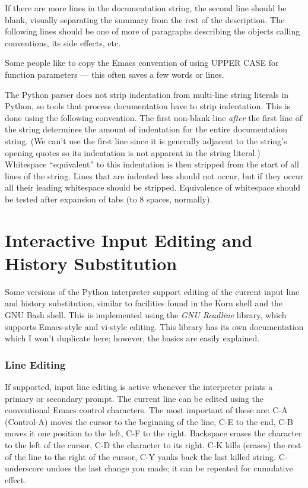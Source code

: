 If there are more lines in the documentation string, the second line
should be blank, visually separating the summary from the rest of the
description.  The following lines should be one of more of paragraphs
describing the objects calling conventions, its side effects, etc.

Some people like to copy the Emacs convention of using UPPER CASE for
function parameters --- this often saves a few words or lines.

The Python parser does not strip indentation from multi-line string
literals in Python, so tools that process documentation have to strip
indentation.  This is done using the following convention.  The first
non-blank line \emph{after} the first line of the string determines the
amount of indentation for the entire documentation string.  (We can't
use the first line since it is generally adjacent to the string's
opening quotes so its indentation is not apparent in the string
literal.)  Whitespace ``equivalent'' to this indentation is then
stripped from the start of all lines of the string.  Lines that are
indented less should not occur, but if they occur all their leading
whitespace should be stripped.  Equivalence of whitespace should be
tested after expansion of tabs (to 8 spaces, normally).


\appendix\chapter{Interactive Input Editing and History Substitution}

Some versions of the Python interpreter support editing of the current
input line and history substitution, similar to facilities found in
the Korn shell and the GNU Bash shell.  This is implemented using the
\emph{GNU Readline} library, which supports Emacs-style and vi-style
editing.  This library has its own documentation which I won't
duplicate here; however, the basics are easily explained.

\subsection{Line Editing}

If supported, input line editing is active whenever the interpreter
prints a primary or secondary prompt.  The current line can be edited
using the conventional Emacs control characters.  The most important
of these are: C-A (Control-A) moves the cursor to the beginning of the
line, C-E to the end, C-B moves it one position to the left, C-F to
the right.  Backspace erases the character to the left of the cursor,
C-D the character to its right.  C-K kills (erases) the rest of the
line to the right of the cursor, C-Y yanks back the last killed
string.  C-underscore undoes the last change you made; it can be
repeated for cumulative effect.

